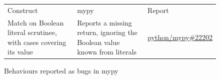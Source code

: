 \begin{figure}
\centering
\footnotesize
\setlength{\tabcolsep}{4pt}
\begin{tabular}{>{\raggedright\arraybackslash}p{}>{\raggedright\arraybackslash}p{}>{\raggedright\arraybackslash}p{}}
\arrayrulecolor{gray!60}\hline
\rowcolor{grammarheadcolor}Construct & mypy & Report \\
Match on Boolean literal scrutinee, with cases covering its value & Reports a missing return, ignoring the Boolean value known from literals & \href{https://github.com/python/mypy/issues/22202}{python/mypy\#22202}
\end{tabular}
\caption{Behaviours reported as bugs in mypy}
\label{fig:mypy-bugs}
\end{figure}
